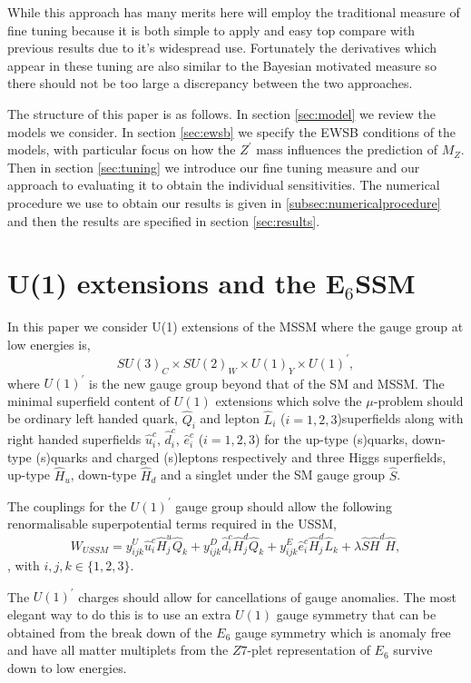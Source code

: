 \documentclass[preprint,amsmath,amssymb,aps,superscriptaddress,prd,showpacs,floatfix]{revtex4-1}
\newcommand{\be}{\begin{equation}}
\newcommand{\ee}{\end{equation}}
\begin{document}
While this approach has many merits here will employ the traditional
measure of fine tuning because it is both simple to apply and easy top
compare with previous results due to it's widespread use.  Fortunately
the derivatives which appear in these tuning are also similar to the
Bayesian motivated measure so there should not be too large a discrepancy between the two approaches.


The structure of this paper is as follows.  In section \ref{sec:model} we review the models we consider.  In section \ref{sec:ewsb} we specify the EWSB conditions of the models, with particular focus on how the $Z^\prime$ mass influences the prediction of $M_Z$.  Then in section \ref{sec:tuning} we introduce our fine tuning measure and our approach to evaluating it to obtain the individual sensitivities.  The numerical procedure we use to obtain our results is given in \ref{subsec:numericalprocedure} and then the results are specified in section \ref{sec:results}. 





 

\section{\label{sec:model}U(1) extensions and the E$_6$SSM}
In this paper we consider U(1) extensions of the MSSM where the gauge group at low energies is,
 \be
SU(3)_C\times SU(2)_W\times U(1)_Y\times U(1)^\prime, \ee 
where $U(1)^\prime$ is the new gauge group beyond that of the SM and MSSM. The minimal superfield content of $U(1)$ extensions which solve the $\mu$-problem should be ordinary left handed quark, $\hat{Q}_i$ and lepton $\hat{L}_i$ ($i=1,2,3$)superfields along with right handed superfields $\hat{u}^c_i$, $\hat{d}^c_i$,  $\hat{e}^c_i$ ($i=1,2,3$) for the up-type (s)quarks, down-type (s)quarks and charged (s)leptons respectively and three Higgs superfields, up-type $\hat{H}_u$, down-type $\hat{H}_d$ and a singlet under the SM gauge group $\hat{S}$.

  The couplings for the $U(1)^\prime$ gauge group should allow the following renormalisable superpotential terms required in the USSM,
\be
W_{USSM} =  y^U_{ijk} \hat{u}^c_i \hat{H}^u_{j} \hat{Q}_k + y^D_{ijk} \hat{d}^c_i \hat{H}^d_{j} \hat{Q}_k + y^E_{ijk} \hat{e}^c_i \hat{H}^d_{j} \hat{L}_k + \lambda \hat{S} \hat{H}^d \hat{H},
\ee, with $i,j,k \in \{1,2,3\}$.  


The $U(1)^\prime$ charges should allow for cancellations of gauge
anomalies. The most elegant way to do this is to use an extra $U(1)$
gauge symmetry that can be obtained from the break down of the $E_6$
gauge symmetry which is anomaly free and have all matter multiplets
from the $Z7$-plet representation of $E_6$ survive down to low energies.
\end{document}
